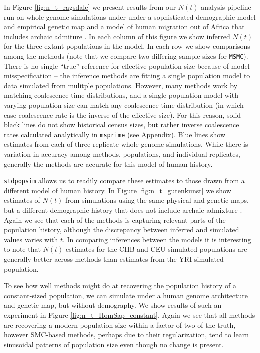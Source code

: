 \documentclass[12pt,halfline,a4paper]{ouparticle}
\newcommand{\stdpopsim}{\texttt{stdpopsim}\xspace}
\newcommand{\MSMC}{\texttt{MSMC}\xspace}
\begin{document}
In Figure \ref{fig:n_t_ragsdale} we present results from our $N(t)$ analysis pipeline
run on whole genome simulations under under a sophisticated demographic model
and empirical genetic map and a model of human migration out of Africa
that includes archaic admiture \citep{ragsdale2019models}. In each column of this figure
we show inferred $N(t)$ for the three extant populations in the model.
In each row we show comparisons among the methods (note that we compare two differing
sample sizes for \MSMC).
There is no single ``true'' reference for effective population size
because of model misspecification -- the inference methods are fitting a single population model
to data simulated from mulitple populations.
However, many methods work by matching coalescence time distributions,
and a single-population model with varying population size can match any coalescence time distribution
(in which case coalescence rate is the inverse of the effective size).
For this reason, solid black lines do not show historical census sizes,
but rather inverse coalescence rates calculated analytically in \texttt{msprime} (see Appendix).
Blue lines show estimates from each of three replicate whole genome simulations.
While there is variation in accuracy among methods, populations, and individual replicates,
generally the methods are accurate for this model of human history.

\stdpopsim allows us to readily compare these estimates to those drawn from a different
model of human history. In Figure \ref{fig:n_t_gutenkunst} we show estimates of
$N(t)$ from simulations using the same physical and genetic maps, but a different demographic
history that does not include archaic admixture \citep{gutenkunst2009inferring}. Again we see that each
of the methods is capturing relevant parts of the population history, although the
discrepancy between inferred and simulated values varies with $t$. In comparing inferences between the
models it is interesting to note that $N(t)$ estimates for the CHB and CEU
simulated populations are generally better across methods than estimates from the YRI
simulated population.

To see how well methods might do at recovering the population history of a constant-sized population,
we can simulate under a human genome architecture and genetic map, but without demography.
We show results of such an
experiment in Figure \ref{fig:n_t_HomSap_constant}. Again we see that all methods
are recovering a modern population size within a factor of two of the truth, however
SMC-based methods, perhaps due to their regularization, tend to learn sinusoidal
patterns of population size even though no change is present.
\end{document}
